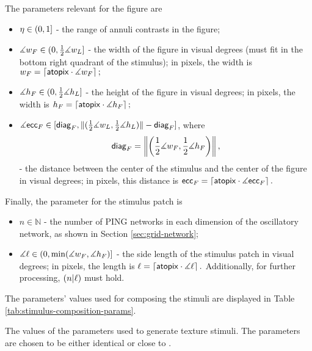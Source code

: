 The parameters relevant for the figure are
\begin{itemize}

    \item $\eta \in (0, 1]$ - the range of annuli contrasts in the figure;
    
    \item $\measuredangle w_F \in (0, \frac{1}{2} \measuredangle w_L]$ - the width of the figure in visual degrees (must fit in the bottom right quadrant of the stimulus); in pixels, the width is
    $
        {w_F} = \left\lceil \mathsf{atopix} \cdot \measuredangle w_F \right\rceil;
    $
    
    \item $\measuredangle h_F \in (0, \frac{1}{2} \measuredangle h_L]$ - the height of the figure in visual degrees; in pixels, the width is
    $
        {h_F} = \left\lceil \mathsf{atopix} \cdot \measuredangle h_F \right\rceil;
    $
    
    \item $\measuredangle \mathsf{ecc}_F \in [\mathsf{diag}_F, \| (\frac{1}{2} \measuredangle w_L, \frac{1}{2} \measuredangle h_L)\| - \mathsf{diag}_F]$, where
    \begin{equation}
        \mathsf{diag}_F = \left\| 
            \left(
                \frac{1}{2} \measuredangle w_F, 
                \frac{1}{2} \measuredangle h_F 
            \right)
        \right\|,
        \label{eq:figdiag}
    \end{equation}
    - the distance between the center of the stimulus and the center of the figure in visual degrees; in pixels, this distance is
    $
        \mathsf{ecc}_F = \left\lceil \mathsf{atopix} \cdot \measuredangle \mathsf{ecc}_F \right\rceil.
    $
\end{itemize}

Finally, the parameter for the stimulus patch is
\begin{itemize}

    \item $n \in \mathbb{N}$ - the number of PING networks in each dimension of the oscillatory network, as shown in Section \ref{sec:grid-network};
    
    \item $\measuredangle \ell \in (0, \min(\measuredangle w_F, \measuredangle h_F)]$ - the side length of the stimulus patch in visual degrees; in pixels, the length is
    $
        \ell = \left\lceil \mathsf{atopix} \cdot \measuredangle \ell \right\rceil.
    $
    Additionally, for further processing, $(n | \ell)$ must hold.
\end{itemize}

The parameters' values used for composing the stimuli are displayed in Table \ref{tab:stimulus-composition-params}.

\begin{table}[!htp]
    \centering
    
    \caption[Stimuli parameters]{The values of the parameters used to generate texture stimuli. The parameters are chosen to be either identical or close to \cite{MaryamPLACEHOLDER}.}
    \label{tab:stimulus-composition-params}
\end{table}